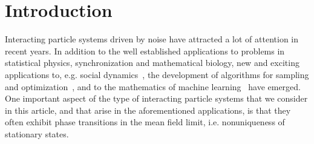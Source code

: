 \documentclass[onefignum,onetabnum]{siamart251216} %
\newcommand{\tcr}[1]{\textcolor{red}{#1}}
\theoremstyle{plain}
\numberwithin{equation}{section}
\numberwithin{theorem}{section}
\begin{document}
%
%
\section{Introduction}
\label{sec:intro}

Interacting particle systems driven by noise have attracted a lot of attention in recent years. In addition to the well established applications to problems in statistical physics, synchronization and mathematical biology, new and exciting applications to, e.g. social dynamics~\cite{frank04}, the development of algorithms for sampling and optimization~\cite{CRS2025, GHV2025}, and to the mathematics of machine learning~\cite{GLPR2025, SirignanoSpiliopoulos2020a, RVE2022, MMN2018} have emerged. One important aspect of the type of interacting particle systems that we consider in this article, and that arise in the aforementioned applications, is that they often exhibit phase transitions in the mean field limit, i.e. nonuniqueness of stationary states.


\end{document}
